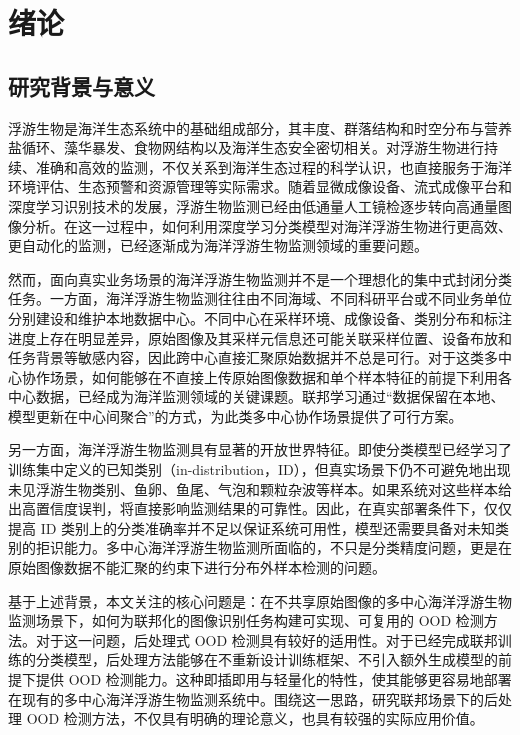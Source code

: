 
\chapter{绪论}

\section{研究背景与意义}

浮游生物是海洋生态系统中的基础组成部分，其丰度、群落结构和时空分布与营养盐循环、藻华暴发、食物网结构以及海洋生态安全密切相关。对浮游生物进行持续、准确和高效的监测，不仅关系到海洋生态过程的科学认识，也直接服务于海洋环境评估、生态预警和资源管理等实际需求\cite{naselli2023ecosystem}。随着显微成像设备、流式成像平台和深度学习识别技术的发展，浮游生物监测已经由低通量人工镜检逐步转向高通量图像分析\cite{eerola2024survey,pitois2025rapid,schmid2023edge}。在这一过程中，如何利用深度学习分类模型对海洋浮游生物进行更高效、更自动化的监测，已经逐渐成为海洋浮游生物监测领域的重要问题。

然而，面向真实业务场景的海洋浮游生物监测并不是一个理想化的集中式封闭分类任务。一方面，海洋浮游生物监测往往由不同海域、不同科研平台或不同业务单位分别建设和维护本地数据中心。不同中心在采样环境、成像设备、类别分布和标注进度上存在明显差异，原始图像及其采样元信息还可能关联采样位置、设备布放和任务背景等敏感内容，因此跨中心直接汇聚原始数据并不总是可行。对于这类多中心协作场景，如何能够在不直接上传原始图像数据和单个样本特征的前提下利用各中心数据，已经成为海洋监测领域的关键课题。联邦学习通过“数据保留在本地、模型更新在中心间聚合”的方式，为此类多中心协作场景提供了可行方案\cite{mcmahan2017fedavg,kairouz2021advances,yang2019federated}。

另一方面，海洋浮游生物监测具有显著的开放世界特征。即使分类模型已经学习了训练集中定义的已知类别（in-distribution，ID），但真实场景下仍不可避免地出现未见浮游生物类别、鱼卵、鱼尾、气泡和颗粒杂波等样本。如果系统对这些样本给出高置信度误判，将直接影响监测结果的可靠性。因此，在真实部署条件下，仅仅提高 ID 类别上的分类准确率并不足以保证系统可用性，模型还需要具备对未知类别的拒识能力。多中心海洋浮游生物监测所面临的，不只是分类精度问题，更是在原始图像数据不能汇聚的约束下进行分布外样本检测的问题。

基于上述背景，本文关注的核心问题是：在不共享原始图像的多中心海洋浮游生物监测场景下，如何为联邦化的图像识别任务构建可实现、可复用的 OOD 检测方法。对于这一问题，后处理式 OOD 检测具有较好的适用性。对于已经完成联邦训练的分类模型，后处理方法能够在不重新设计训练框架、不引入额外生成模型的前提下提供 OOD 检测能力。这种即插即用与轻量化的特性，使其能够更容易地部署在现有的多中心海洋浮游生物监测系统中。围绕这一思路，研究联邦场景下的后处理 OOD 检测方法，不仅具有明确的理论意义，也具有较强的实际应用价值。

